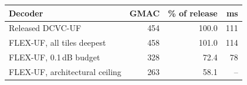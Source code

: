 \begin{tabular}{lrrr}
\toprule
Decoder & GMAC & \% of release & ms \\
\midrule
Released DCVC-UF & 454 & 100.0 & 111 \\
FLEX-UF, all tiles deepest & 458 & 101.0 & 114 \\
FLEX-UF, 0.1\,dB budget & 328 & 72.4 & 78 \\
FLEX-UF, architectural ceiling & 263 & 58.1 & -- \\
\bottomrule
\end{tabular}
